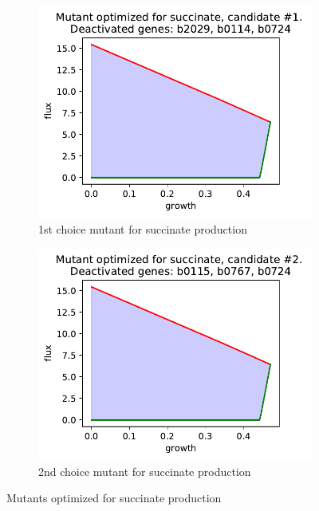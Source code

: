 \documentclass{scrartcl}
\begin{document}
      
   \begin{figure}[h]
      \centering
      \begin{subfigure}{.49\textwidth}
         \centering
         \includegraphics[width=\linewidth]{q1_results/result_q1_succinate_1.pdf}
         \caption{1st choice mutant for succinate production}
         \label{fig:succinate_mutant_1}
      \end{subfigure}%
      \begin{subfigure}{.49\textwidth}
         \centering
         \includegraphics[width=\linewidth]{q1_results/result_q1_succinate_2.pdf}
         \caption{2nd choice mutant for succinate production}
         \label{fig:succinate_mutant_2}
      \end{subfigure}
      \caption{Mutants optimized for succinate production}
      \label{fig:succinate_mutants}
   \end{figure}
   
\end{document}
